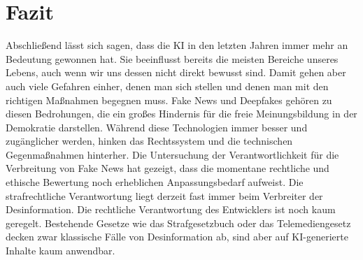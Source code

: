 \documentclass[Thesis.tex]{subfiles}
\begin{document}
\clearpage
\section{Fazit}
Abschließend lässt sich sagen, dass die \ac{KI} in den letzten Jahren immer mehr an
Bedeutung gewonnen hat. Sie beeinflusst bereits die meisten Bereiche unseres 
Lebens, auch wenn wir uns dessen nicht direkt bewusst sind. Damit gehen aber auch 
viele Gefahren einher, denen man sich stellen und denen man mit den richtigen
Maßnahmen begegnen muss.
Fake News und Deepfakes gehören zu diesen Bedrohungen, die ein großes Hindernis 
für die freie Meinungsbildung in der Demokratie darstellen. Während diese Technologien
immer besser und zugänglicher werden, hinken das Rechtssystem und die technischen
Gegenmaßnahmen hinterher.
Die Untersuchung der Verantwortlichkeit für die Verbreitung von Fake News hat gezeigt,
dass die momentane rechtliche und ethische Bewertung noch erheblichen Anpassungsbedarf 
aufweist. Die strafrechtliche Verantwortung liegt derzeit fast immer beim Verbreiter 
der Desinformation. Die rechtliche Verantwortung des Entwicklers ist noch kaum 
geregelt. Bestehende Gesetze wie das Strafgesetzbuch oder das Telemediengesetz 
decken zwar klassische Fälle von Desinformation ab, sind aber auf \ac{KI}-generierte 
Inhalte kaum anwendbar.
\end{document}
